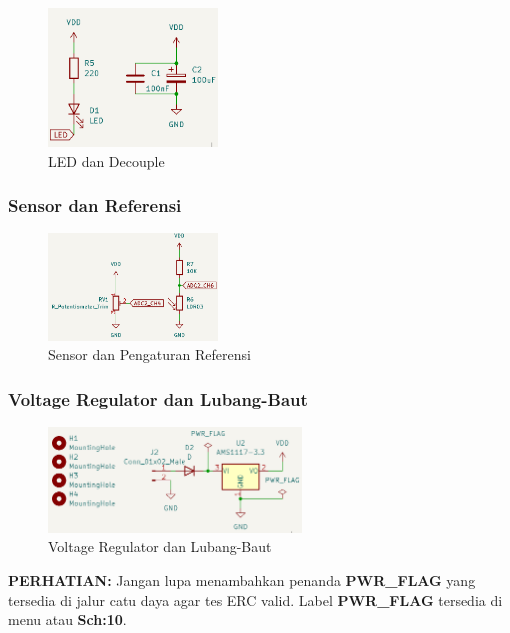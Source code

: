 \documentclass[12pt]{book}
\begin{document}
	\begin{figure}[!ht]
		\centering
		\includegraphics[width=0.4\textwidth]{images/sch/sch_19}
		\caption{LED dan Decouple}
	\end{figure}

	\subsubsection{Sensor dan Referensi}

	\begin{figure}[!ht]
		\centering
		\includegraphics[width=0.4\textwidth]{images/sch/sch_20}
		\caption{Sensor dan Pengaturan Referensi}
	\end{figure}

	\subsubsection{Voltage Regulator dan Lubang-Baut}

	\begin{figure}[!ht]
		\centering
		\includegraphics[width=0.6\textwidth]{images/sch/sch_21}
		\caption{Voltage Regulator dan Lubang-Baut}
	\end{figure}

	\textbf{PERHATIAN:} Jangan lupa menambahkan penanda \textbf{PWR\_FLAG} yang tersedia di
	jalur catu daya agar tes ERC valid.
	Label \textbf{PWR\_FLAG} tersedia di menu  atau \textbf{Sch:10}.
\end{document}
